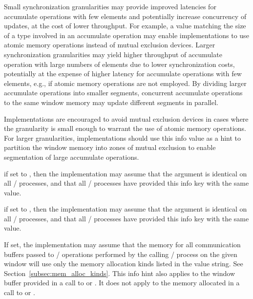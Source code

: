 \begin{description}
{}
%
\begin{users}
Small synchronization granularities may provide improved latencies for accumulate operations with few elements and potentially increase concurrency of updates, at the cost of lower throughput.
For example, a value matching the size of a type involved in an accumulate operation may enable implementations to use atomic memory operations instead of mutual exclusion devices.
Larger synchronization granularities may yield higher throughput of accumulate operation with large numbers of elements due to lower synchronization costs, potentially at the expense of higher latency for accumulate operations with few elements, e.g., if atomic memory operations are not employed.
By dividing larger accumulate operations into smaller segments, concurrent accumulate operations to the same window memory may update different segments in parallel.
\end{users}
%
\begin{implementors}
Implementations are encouraged to avoid mutual exclusion devices in cases where the granularity is small enough to warrant the use of atomic memory operations.
For larger granularities, implementations should use this info value as a hint to partition the window memory into zones of mutual exclusion to enable segmentation of large accumulate operations.
\end{implementors}
%
\item[\infokeymain{same\_size} (boolean, default: \infoval{false}):]if set to ,
then the implementation may assume that the argument  is
identical on all \mpi/ processes, and that all \mpi/ processes have provided this
info key with the same value.
\item[\infokeymain{same\_disp\_unit} (boolean, default: \infoval{false}):]if set to ,
then the implementation
may assume that the argument 
is identical on all \mpi/ processes, and
that all \mpi/ processes have provided this info key with the same value.
\item[\infokey{mpi\_assert\_memory\_alloc\_kinds} (string, not set by default):]
If set, the implementation may assume that the memory for all
communication buffers passed to \MPI/ operations performed by the calling \MPI/
process on the given window will use only the memory allocation kinds
listed in the value string.
See Section~\ref{subsec:mem_alloc_kinds}.
This info hint also applies to the window buffer provided in a call to
 or . It does not
apply to the memory
allocated in a call to  or
.
\end{description}

